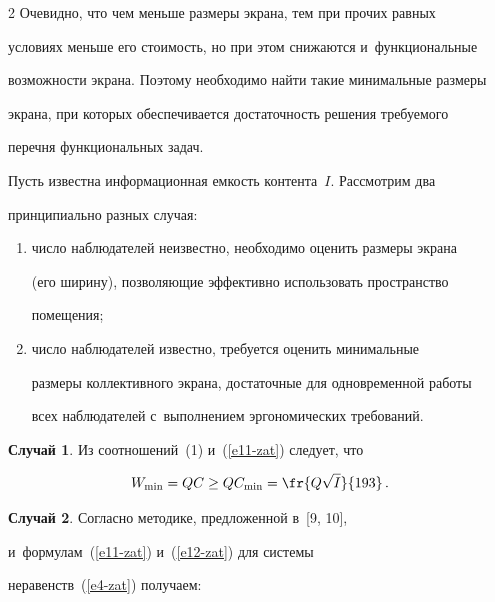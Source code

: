 \begin{multicols}{2}
     Очевидно, что чем меньше размеры экрана, тем при прочих равных

условиях меньше его стоимость, но при этом снижаются и~функциональные

возможности экрана. Поэтому необходимо найти такие минимальные размеры

экрана, при которых обеспечивается достаточность решения требуемого

перечня функциональных задач.



     Пусть известна информационная емкость контента~$I$. Рассмотрим два

принципиально разных случая:

     \begin{enumerate}[(1)]

\item число наблюдателей неизвестно, необходимо оценить размеры экрана

(его ширину), позволяющие эффективно использовать пространство

помещения;\\[-13pt]

\item число наблюдателей известно, требуется оценить минимальные

размеры коллективного экрана, достаточные для одновременной работы

всех наблюдателей с~выполнением эргономических требований.

\end{enumerate}



\noindent

\textbf{Случай 1}. Из соотношений~(1) и~(\ref{e11-zat}) следует, что

\begin{equation*}

W_{\min} =QC\geq QC_{\min}=\fr{Q\sqrt{I}}{193}\,.


\end{equation*}



\smallskip



\noindent

\textbf{Случай 2}. Согласно методике, предложенной в~[9, 10],

и~формулам~(\ref{e11-zat}) и~(\ref{e12-zat}) для системы

неравенств~(\ref{e4-zat}) получаем:




\end{multicols}
